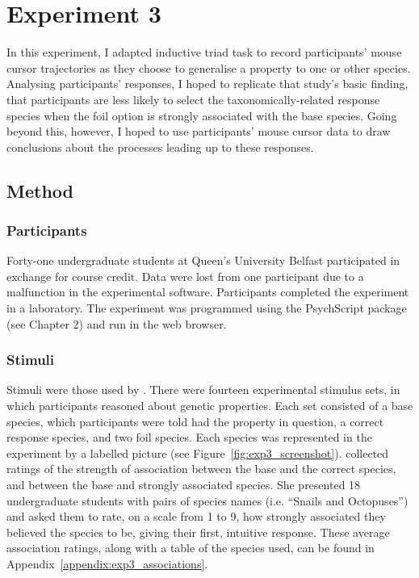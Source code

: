 
\section{Experiment 3}

In this experiment, I adapted 
inductive triad task to record participants' mouse cursor trajectories
as they choose to generalise a property to one or other species.
Analysing participants' responses, I hoped to replicate that study's %
basic finding, that participants are less likely to select the taxonomically-related response species
when the foil option is strongly associated with the base species.
Going beyond this, however, I hoped to use participants'
mouse cursor data to draw conclusions about the processes leading up to these responses.

\subsection{Method}

\subsubsection{Participants}

Forty-one undergraduate students at Queen's University Belfast
participated in exchange for course credit.
Data were lost from one participant due to
a malfunction in the experimental software.
Participants completed the experiment in a laboratory.
The experiment was programmed using the PsychScript package
(see Chapter 2) and run in the web browser.

\subsubsection{Stimuli}

Stimuli were those used by \citet{Bright}.
There were fourteen experimental stimulus sets,
in which participants reasoned about genetic properties.
Each set consisted of a base species,
which participants were told had the property in question,
a correct response species, and two foil species.
Each species was represented in the experiment
by a labelled picture (see Figure~\ref{fig:exp3_screenshot}).
\citet[][Chapter 2]{Crisp-Bright2010} collected ratings of the strength of association
between the base and the correct species,
and between the base and strongly associated species.
She presented 18 undergraduate students
with pairs of species names (i.e. ``Snails and Octopuses'')
and asked them to rate, on a scale from 1 to 9,
how strongly associated they believed the species to be,
giving their first, intuitive response.
These average association ratings,
along with a table of the species used,
can be found in Appendix~\ref{appendix:exp3_associations}.

